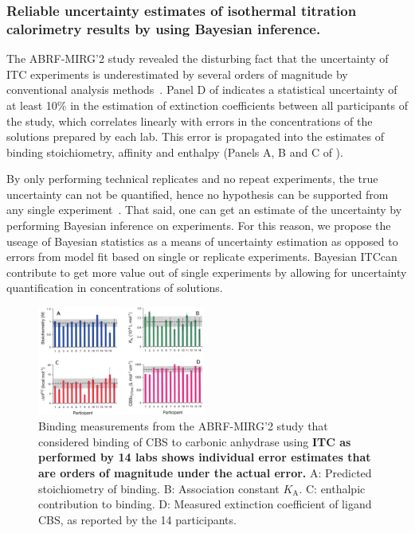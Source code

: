 \documentclass[10pt,final]{article}
\begin{document}
\subsubsection*{Reliable uncertainty estimates of isothermal titration calorimetry results by using Bayesian inference.}
The ABRF-MIRG'2 study revealed the disturbing fact that the uncertainty of ITC experiments is underestimated by several orders of magnitude by conventional analysis methods~\cite{Myszka2003a}. Panel D of  indicates a statistical uncertainty of at least 10\% in the estimation of extinction coefficients between all participants of the study, which correlates linearly with errors in the concentrations of the solutions prepared by each lab. This error is propagated into the estimates of binding stoichiometry, affinity and enthalpy  (Panels A, B and C of ).

By only performing technical replicates  and no repeat experiments, the true uncertainty can not be quantified, hence no hypothesis can be supported from any single experiment~\cite{Vaux2012a}. That said, one can get an estimate of the uncertainty by performing Bayesian inference on experiments. For this reason, we propose the useage of Bayesian statistics as a means of uncertainty estimation as opposed to errors from model fit based on single or replicate experiments. Bayesian ITC\texttrademark can contribute to get more value out of single experiments by allowing for uncertainty quantification in concentrations of solutions. 

\begin{figure}[H]
	\centering
	\includegraphics[width=0.49\textwidth]{figures/cbs_ca_II.PNG}
	\caption{Binding measurements from the ABRF-MIRG'2 study that considered binding of CBS to carbonic anhydrase using \textbf{ITC as performed by 14 labs shows individual error estimates that are orders of magnitude under the actual error.} A: Predicted stoichiometry of binding. B: Association constant $K_\mathrm{A}$. C: enthalpic contribution to binding. D: Measured extinction coefficient of ligand CBS, as reported by the 14 participants.~\cite{Myszka2003a}}
	\label{figure:abrf-mirg2}
\end{figure}
\end{document}
